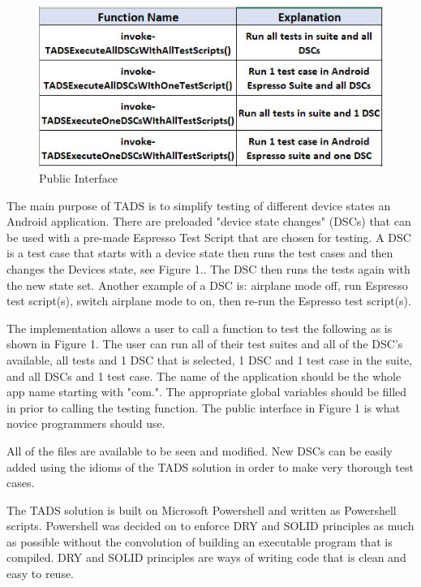 \begin{figure}[h]
	\centering
	\caption[Public Interface]{Public Interface}
	\label{fig:table2}
	\includegraphics[width=1\linewidth]{table2}
\end{figure}

The main purpose of TADS is to simplify testing of different device states an Android application.  There are preloaded "device state changes" (DSCs) that can be used with a pre-made Espresso Test Script that are chosen for testing.  A DSC is a test case that starts with a device state then runs the test cases and then changes the Devices state, see Figure 1..  The DSC then runs the tests again with the new state set.  Another example of a DSC is: airplane mode off, run Espresso test script(s), switch airplane mode to on, then re-run the Espresso test script(s).

The implementation allows a user to call a function to test the following as is shown in Figure 1.  The user can run all of their test suites and all of the DSC's available, all tests and 1 DSC that is selected, 1 DSC and 1 test case in the suite, and all DSCs and 1 test case. The name of the application should be the whole app name starting with "com.".  The appropriate global variables should be filled in prior to calling the testing function. The public interface in Figure 1 is what novice programmers should use.

All of the files are available to be seen and modified.  New DSCs can be easily added using the idioms of the TADS solution in order to make very thorough test cases.

The TADS solution is built on Microsoft Powershell and written as Powershell scripts.  Powershell was decided on to enforce DRY and SOLID principles as much as possible without the convolution of building an executable program that is compiled.  DRY and SOLID principles are ways of writing code that is clean and easy to reuse.  

